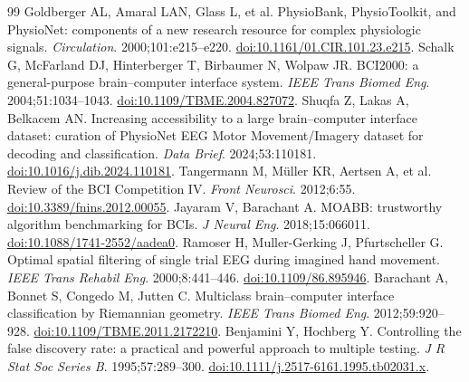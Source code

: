 \documentclass[11pt]{article}
\begin{document}
\FloatBarrier
\begin{thebibliography}{99}
 Goldberger AL, Amaral LAN, Glass L, et al. PhysioBank, PhysioToolkit, and PhysioNet: components of a new research resource for complex physiologic signals. \textit{Circulation}. 2000;101:e215--e220. \href{https://doi.org/10.1161/01.CIR.101.23.e215}{doi:10.1161/01.CIR.101.23.e215}.
 Schalk G, McFarland DJ, Hinterberger T, Birbaumer N, Wolpaw JR. BCI2000: a general-purpose brain--computer interface system. \textit{IEEE Trans Biomed Eng}. 2004;51:1034--1043. \href{https://doi.org/10.1109/TBME.2004.827072}{doi:10.1109/TBME.2004.827072}.
 Shuqfa Z, Lakas A, Belkacem AN. Increasing accessibility to a large brain--computer interface dataset: curation of PhysioNet EEG Motor Movement/Imagery dataset for decoding and classification. \textit{Data Brief}. 2024;53:110181. \href{https://doi.org/10.1016/j.dib.2024.110181}{doi:10.1016/j.dib.2024.110181}.
 Tangermann M, M\"uller KR, Aertsen A, et al. Review of the BCI Competition IV. \textit{Front Neurosci}. 2012;6:55. \href{https://doi.org/10.3389/fnins.2012.00055}{doi:10.3389/fnins.2012.00055}.
 Jayaram V, Barachant A. MOABB: trustworthy algorithm benchmarking for BCIs. \textit{J Neural Eng}. 2018;15:066011. \href{https://doi.org/10.1088/1741-2552/aadea0}{doi:10.1088/1741-2552/aadea0}.
 Ramoser H, Muller-Gerking J, Pfurtscheller G. Optimal spatial filtering of single trial EEG during imagined hand movement. \textit{IEEE Trans Rehabil Eng}. 2000;8:441--446. \href{https://doi.org/10.1109/86.895946}{doi:10.1109/86.895946}.
 Barachant A, Bonnet S, Congedo M, Jutten C. Multiclass brain--computer interface classification by Riemannian geometry. \textit{IEEE Trans Biomed Eng}. 2012;59:920--928. \href{https://doi.org/10.1109/TBME.2011.2172210}{doi:10.1109/TBME.2011.2172210}.
 Benjamini Y, Hochberg Y. Controlling the false discovery rate: a practical and powerful approach to multiple testing. \textit{J R Stat Soc Series B}. 1995;57:289--300. \href{https://doi.org/10.1111/j.2517-6161.1995.tb02031.x}{doi:10.1111/j.2517-6161.1995.tb02031.x}.
\end{thebibliography}
\end{document}
